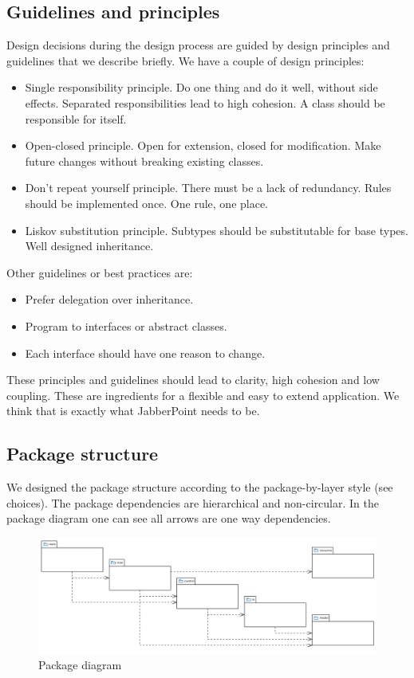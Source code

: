 \documentclass[a4paper]{article}
\begin{document}
\subsection{Guidelines and principles} 
Design decisions during the design process are guided by design principles and guidelines that we describe briefly.
We have a couple of design principles:
\begin{itemize}
\item Single responsibility principle. Do one thing and do it well, without side effects. Separated responsibilities lead to high cohesion. A class should be responsible for itself.
\item Open-closed principle. Open for extension, closed for modification. Make future changes without breaking existing classes.
\item Don't repeat yourself principle. There must be a lack of redundancy. Rules should be implemented once. One rule, one place.
\item Liskov substitution principle. Subtypes should be substitutable for base types. Well designed inheritance. 
\end{itemize}

Other guidelines or best practices are:
\begin{itemize}
\item Prefer delegation over inheritance.
\item Program to interfaces or abstract classes.
\item Each interface should have one reason to change.
\end{itemize}
These principles and guidelines should lead to clarity, high cohesion and low coupling. These are ingredients for a flexible and easy to extend application. We think that is exactly what JabberPoint needs to be. 

\subsection{Package structure}
We designed the package structure according to the package-by-layer style (see choices).
The package dependencies are hierarchical and non-circular. In the package diagram one can see all arrows are one way dependencies.

\begin{figure}[!htpb]
  \includegraphics[width=\linewidth]{JabberPointPackageDiagram.png}
  \caption{Package diagram}
  \label{fig:packdiag}
\end{figure}
\end{document}
